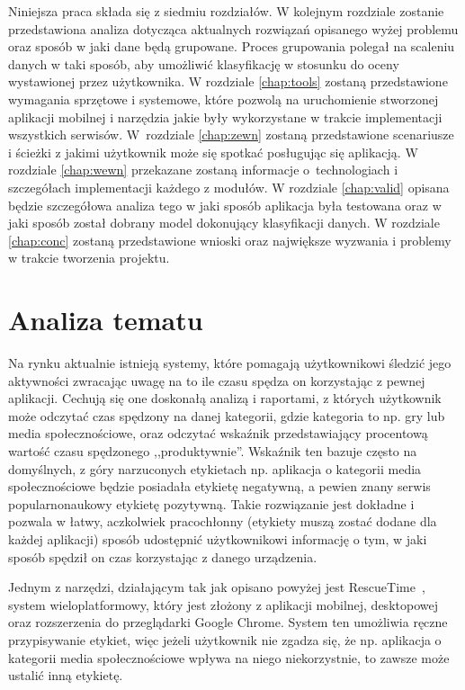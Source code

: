 \documentclass[a4paper,twoside,12pt]{book}
\begin{document}
Niniejsza praca składa się z siedmiu rozdziałów. W kolejnym rozdziale zostanie przedstawiona analiza dotycząca aktualnych rozwiązań opisanego wyżej problemu oraz sposób w jaki dane będą grupowane. Proces grupowania polegał na scaleniu danych w taki sposób, aby umożliwić klasyfikację w stosunku do oceny wystawionej przez użytkownika. W rozdziale
\ref{chap:tools} zostaną przedstawione wymagania sprzętowe i systemowe, które pozwolą na uruchomienie stworzonej aplikacji mobilnej i narzędzia jakie były wykorzystane w trakcie implementacji wszystkich serwisów. W~rozdziale \ref{chap:zewn} zostaną przedstawione scenariusze i ścieżki z jakimi użytkownik może się spotkać posługując się aplikacją. W rozdziale \ref{chap:wewn} przekazane zostaną informacje o~technologiach i szczegółach implementacji każdego z modułów. W rozdziale \ref{chap:valid} opisana będzie szczegółowa analiza tego w jaki sposób aplikacja była testowana oraz w jaki sposób został dobrany model dokonujący klasyfikacji danych. W rozdziale \ref{chap:conc} zostaną przedstawione wnioski oraz największe wyzwania i problemy w trakcie tworzenia projektu.


\chapter{Analiza tematu}
\label{chap:analys}



Na rynku aktualnie istnieją systemy, które pomagają użytkownikowi śledzić jego aktywności zwracając uwagę na to ile czasu spędza on korzystając z pewnej aplikacji. Cechują się one doskonałą analizą i raportami, z których użytkownik może odczytać czas spędzony na danej kategorii, gdzie kategoria to np. gry lub media społecznościowe, oraz odczytać wskaźnik przedstawiający procentową wartość czasu spędzonego ,,produktywnie''. Wskaźnik ten bazuje często na domyślnych, z góry narzuconych etykietach np. aplikacja o kategorii media społecznościowe będzie posiadała etykietę negatywną, a pewien znany serwis popularnonaukowy etykietę pozytywną. Takie rozwiązanie jest dokładne i pozwala w łatwy, aczkolwiek pracochłonny (etykiety muszą zostać dodane dla każdej aplikacji) sposób udostępnić użytkownikowi informację o tym, w jaki sposób spędził on czas korzystając z danego urządzenia.     

Jednym z narzędzi, działającym tak jak opisano powyżej jest RescueTime~\cite{rescue_time}, system wieloplatformowy, który jest złożony z aplikacji mobilnej, desktopowej oraz rozszerzenia do przeglądarki Google Chrome. System ten umożliwia ręczne przypisywanie etykiet, więc jeżeli użytkownik nie zgadza się, że np. aplikacja o kategorii media społecznościowe wpływa na niego niekorzystnie, to zawsze może ustalić inną etykietę. 
\end{document}
